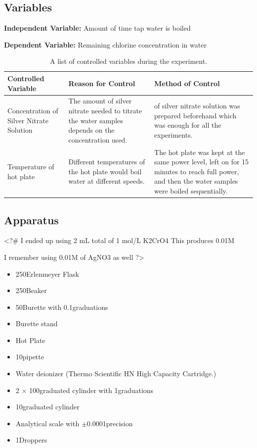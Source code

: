 \documentclass[11pt]{article}
\begin{document}
\subsection{Variables}

\textbf{Independent Variable:} Amount of time tap water is boiled

\textbf{Dependent Variable:} Remaining chlorine concentration in water

\begin{table}[H]
	\def\arraystretch{1.5}
	\caption{A list of controlled variables during the experiment.}
	\begin{tabularx}{\linewidth}{|
			>{\RaggedRight}X|
			>{\RaggedRight}X|
			>{\RaggedRight}X|
		}
		\hline
		\textbf{Controlled Variable}
		 & \textbf{Reason for Control}
		 & \textbf{Method of Control}
		\\\hline
		Concentration of Silver Nitrate Solution
		 & The amount of silver nitrate needed to titrate the water samples depends on the concentration used.
		 & 50\ml of silver nitrate solution was prepared beforehand which was enough for all the experiments.
		\\\hline
		Temperature of hot plate
		 & Different temperatures of the hot plate would boil water at different speeds.
		 & The hot plate was kept at the same power level, left on for 15 minutes to reach full power, and then the water samples were boiled sequentially.
		\\\hline
	\end{tabularx}
\end{table}

\subsection{Apparatus}

<?#
I ended up using 2 mL total of 1 mol/L K2CrO4
This produces 0.01M

I remember using 0.01M of AgNO3 as well
?>

\begin{itemize}
	\item 250\ml Erlenmeyer Flask
	\item 250\ml Beaker
	\item 50\ml Burette with 0.1\ml graduations
	\item Burette stand
	\item Hot Plate
	\item 10\ml pipette
	\item Water deionizer (Thermo Scientific HN High Capacity Cartridge.)
	\item 2 $\times$ 100\ml graduated cylinder with 1\ml graduations
	\item 10\ml graduated cylinder
	\item Analytical scale with $\pm$0.0001\gram precision
	\item 1\ml Droppers
\end{itemize}
\end{document}
